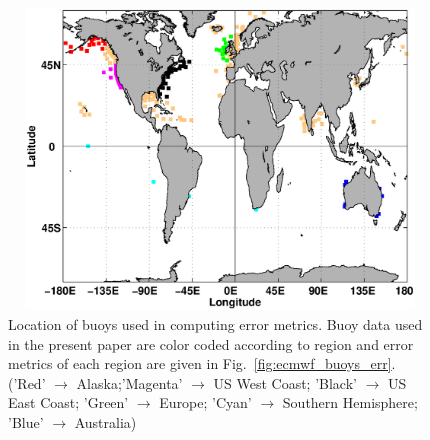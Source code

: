 \documentclass[12pt]{article}
\begin{document}
\begin{figure}[t]
\noindent\includegraphics[width=12cm,height=8cm]{./figures/buoy_map.eps}
\caption{Location of buoys used in computing error metrics. Buoy data used in the present paper are color coded according to region and error metrics of each region are given in Fig.~\ref{fig:ecmwf_buoys_err}. ('Red' $ \rightarrow $ Alaska;'Magenta' $ \rightarrow $ US West Coast; 'Black' $ \rightarrow $ US East Coast; 'Green' $ \rightarrow $ Europe; 'Cyan' $ \rightarrow $ Southern Hemisphere; 'Blue' $ \rightarrow $ Australia)}
\label{fig:ecmwf_buoys}
\end{figure}
\end{document}
